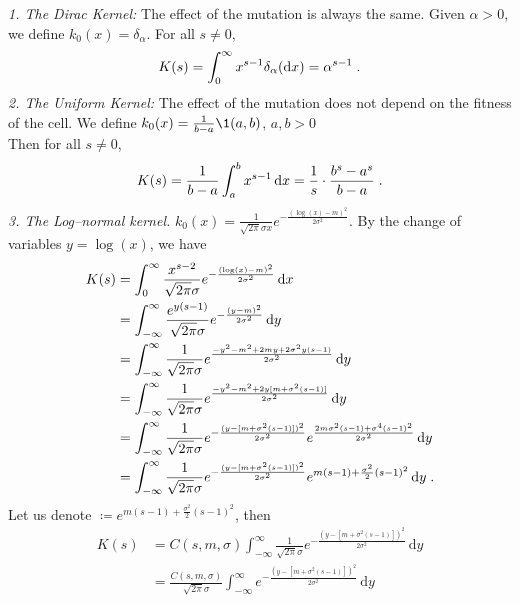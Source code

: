 \documentclass[11pt]{amsart}
\newcommand{\diff}{\,\mathrm{d}}
\newcommand{\dd}{\mathrm{d}}
\begin{document}
\textit{1. The Dirac Kernel:} The effect of the mutation is always the same. Given $\alpha > 0$, we define $k_0(x) = \delta_\alpha$. For all $s \neq 0$,
\begin{align*}
    K(s) = \int_0^\infty x^{s-1} \delta_\alpha(\dd x) = \alpha^{s-1}
    \eqfinp
\end{align*}
\textit{2. The Uniform Kernel:} The effect of the mutation does not depend on the fitness of the cell. We define $k_0(x) = \frac{1}{b-a}\1{(a,b)}$, $a,b > 0$ \\
Then for all $s \neq 0$, 
    \begin{align*}
        K(s) = \frac{1}{b-a}\int_a^b x^{s-1}\diff x = \frac1s \cdot\frac{b^s - a^s}{b-a}
        \eqfinp
    \end{align*}
\textit{3. The Log--normal kernel.} $k_0(x) = \frac{1}{\sqrt{2\pi}\sigma x} e^{-\frac{(\log(x)-m)^2}{2\sigma^2}}$.
By the change of variables $y = \log(x)$, we have
    \begin{align*}
        K(s) 
        &= \int_0^\infty \frac{x^{s-2}}{\sqrt{2\pi}\sigma} e^{-\frac{(\log(x)-m)^2}{2\sigma^2}} \diff x \\
        &= \int_{-\infty}^\infty \frac{e^{y(s-1)}}{\sqrt{2\pi}\sigma} e^{-\frac{(y-m)^2}{2\sigma^2}} \diff y \\
        &=  \int_{-\infty}^\infty \frac{1}{\sqrt{2\pi}\sigma} e^{\frac{-y^2 - m^2 + 2m y + 2\sigma^2 y(s-1)}{2\sigma^2}} \diff y \\
        &=  \int_{-\infty}^\infty \frac{1}{\sqrt{2\pi}\sigma} e^{\frac{-y^2 - m^2 + 2y[m + \sigma^2 (s-1)]}{2\sigma^2}} \diff y \\
        &=  \int_{-\infty}^\infty \frac{1}{\sqrt{2\pi}\sigma} 
        e^{-\frac{(y - [m + \sigma^2 (s-1)])^2}{2\sigma^2}}
        e^{\frac{2m \sigma^2(s-1)+\sigma^4(s-1)^2}{2\sigma^2}}\diff y \\
        &=  \int_{-\infty}^\infty \frac{1}{\sqrt{2\pi}\sigma} 
        e^{-\frac{(y - [m + \sigma^2 (s-1)])^2}{2\sigma^2}}
        e^{m (s-1)+\frac{\sigma^2}{2}(s-1)^2}\diff y
        \eqfinp
    \end{align*}
Let us denote $  \coloneqq e^{m (s-1)+\frac{\sigma^2}{2}(s-1)^2}$, then 
\begin{align*}
    K(s) 
    &=  C(s,m,\sigma) \int_{-\infty}^\infty \frac{1}{\sqrt{2\pi}\sigma} 
        e^{-\frac{(y - [m + \sigma^2 (s-1)])^2}{2\sigma^2}}\diff y
        \\
        &=  \frac{C(s,m,\sigma)}{\sqrt{2\pi}\sigma} \int_{-\infty}^\infty
        e^{-\frac{(y - [m + \sigma^2 (s-1)])^2}{2\sigma^2}}\diff y
\end{align*}
\end{document}
